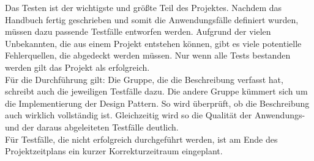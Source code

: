 Das Testen ist der wichtigste und größte Teil des Projektes. Nachdem das Handbuch fertig
geschrieben und somit die Anwendungsfälle definiert wurden, müssen dazu passende Testfälle
entworfen werden. Aufgrund der vielen Unbekannten, die aus einem Projekt entstehen können,
gibt es viele potentielle Fehlerquellen, die abgedeckt werden müssen. Nur wenn alle Tests 
bestanden werden gilt das Projekt als erfolgreich.\\
Für die Durchführung gilt: Die Gruppe, die die Beschreibung verfasst hat,
schreibt auch die jeweiligen Testfälle dazu. Die andere Gruppe kümmert sich um die
Implementierung der Design Pattern. So wird überprüft, ob die Beschreibung auch
wirklich vollständig ist. Gleichzeitig wird so die Qualität der Anwendungs- und
der daraus abgeleiteten Testfälle deutlich.\\
Für Testfälle, die nicht erfolgreich durchgeführt werden, ist am Ende des Projektzeitplans
ein kurzer Korrekturzeitraum eingeplant. 